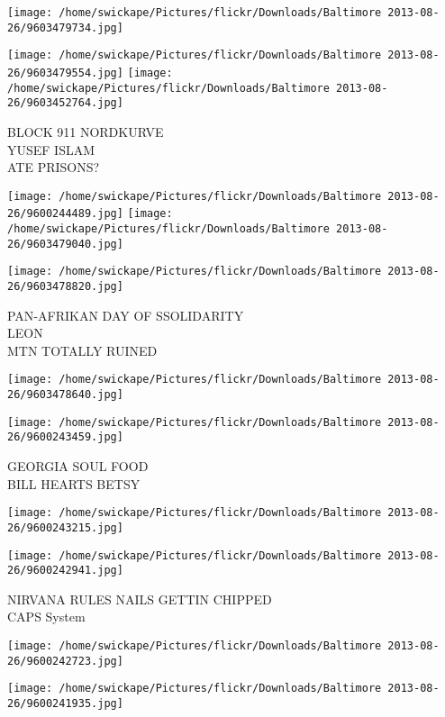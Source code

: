 \documentclass[10pt,letterpaper]{article}
\begin{document}
\texttt{[image: /home/swickape/Pictures/flickr/Downloads/Baltimore 2013-08-26/9603479734.jpg]}

\vspace{0.25in}
\texttt{[image: /home/swickape/Pictures/flickr/Downloads/Baltimore 2013-08-26/9603479554.jpg]}
\texttt{[image: /home/swickape/Pictures/flickr/Downloads/Baltimore 2013-08-26/9603452764.jpg]}

BLOCK 911 NORDKURVE\\
YUSEF ISLAM\\
ATE PRISONS?\\
\pagebreak

\texttt{[image: /home/swickape/Pictures/flickr/Downloads/Baltimore 2013-08-26/9600244489.jpg]}
\texttt{[image: /home/swickape/Pictures/flickr/Downloads/Baltimore 2013-08-26/9603479040.jpg]}

\texttt{[image: /home/swickape/Pictures/flickr/Downloads/Baltimore 2013-08-26/9603478820.jpg]}

PAN{-}AFRIKAN DAY OF SSOLIDARITY\\
LEON\\
MTN TOTALLY RUINED\\
\pagebreak

\texttt{[image: /home/swickape/Pictures/flickr/Downloads/Baltimore 2013-08-26/9603478640.jpg]}

\vspace{0.25in}
\texttt{[image: /home/swickape/Pictures/flickr/Downloads/Baltimore 2013-08-26/9600243459.jpg]}

GEORGIA SOUL FOOD\\
BILL HEARTS BETSY\\
\pagebreak

\texttt{[image: /home/swickape/Pictures/flickr/Downloads/Baltimore 2013-08-26/9600243215.jpg]}

\vspace{0.25in}
\texttt{[image: /home/swickape/Pictures/flickr/Downloads/Baltimore 2013-08-26/9600242941.jpg]}

NIRVANA RULES NAILS GETTIN CHIPPED\\
CAPS System\\
\pagebreak

\texttt{[image: /home/swickape/Pictures/flickr/Downloads/Baltimore 2013-08-26/9600242723.jpg]}

\vspace{0.25in}
\texttt{[image: /home/swickape/Pictures/flickr/Downloads/Baltimore 2013-08-26/9600241935.jpg]}
\end{document}
